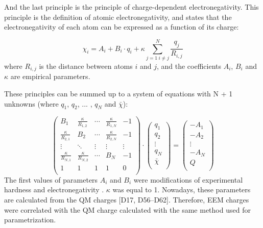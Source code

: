And the last principle is the principle of charge-dependent electronegativity.
This principle is the definition of atomic electronegativity, and states that
the electronegativity of each atom can be expressed as a function of its charge: 

\begin{equation}
    \chi_i = A_i + B_i \cdot q_i + \kappa \sum^N_{j=1 \: i\neq{j}} \frac{q_j}{R_{i,j}} 
\end{equation}
where $R_{i,j}$ is the distance between atoms $i$ and $j$, and the coefficients
$A_i$, $B_i$ and $\kappa$ are empirical parameters. 

These principles can be summed up to a system of equations with N + 1 unknowns
(where $q_1$, $q_2$, ... , $q_N$ and $\bar{\chi}$):

\begin{equation}
    \left(
    \begin{array}{ccccc}
        B_1                    & \frac{\kappa}{R_{1,2}} & \cdots & \frac{\kappa}{R_{1,N}} & -1     \\
        \frac{\kappa}{R_{2,1}} & B_2                    & \cdots & \frac{\kappa}{R_{2,N}} & -1     \\
        \vdots                 & \ddots                 & \vdots & \vdots                 & \vdots \\
        \frac{\kappa}{R_{N,1}} & \frac{\kappa}{R_{N,2}} & \cdots & B_N                    & -1     \\ 
        1                      & 1                      & 1      & 1                      & 0      \\  
    \end{array}
    \right) \cdot
    \left(
    \begin{array}{c}
        q_1        \\
        q_2        \\
        \vdots     \\
        q_N        \\
        \bar{\chi} \\
    \end{array}
    \right) =
    \left(
    \begin{array}{c}
        -A_1   \\
        -A_2   \\
        \vdots \\
        -A_N   \\
        Q      \\
    \end{array}
    \right)
\end{equation}
The first values of parameters $A_i$ and $B_i$ were modifications
of experimental hardness and electronegativity \cite{Mortier1986}. $\kappa$ was
equal to 1. Nowadays, these parameters are calculated from the QM
charges [D17, D56–D62]. Therefore, EEM charges were correlated with the QM
charge calculated with the same method used for parametrization.

